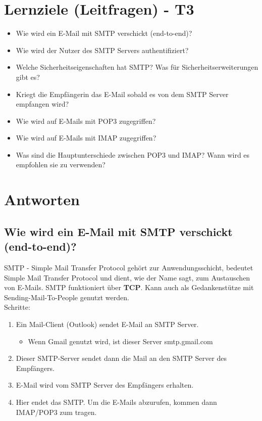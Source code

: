 \section{Lernziele (Leitfragen) - T3}
\begin{itemize}
    \item Wie wird ein E-Mail mit SMTP verschickt (end-to-end)?
    \item Wie wird der Nutzer des SMTP Servers authentifiziert?
    \item Welche Sicherheitseigenschaften hat SMTP? Was für Sicherheitserweiterungen gibt es?
    \item Kriegt die Empfängerin das E-Mail sobald es von dem SMTP Server empfangen wird?
    \item Wie wird auf E-Mails mit POP3 zugegriffen?
    \item Wie wird auf E-Mails mit IMAP zugegriffen?
    \item Was sind die Hauptunterschiede zwischen POP3 und IMAP? Wann wird es empfohlen sie zu verwenden?
\end{itemize}

\section{Antworten}
\subsection*{Wie wird ein E-Mail mit SMTP verschickt (end-to-end)?}
SMTP - Simple Mail Transfer Protocol gehört zur Anwendungsschicht, bedeutet Simple Mail Transfer Protocol und dient, wie der Name sagt, zum Austauschen von E-Mails. SMTP funktioniert über \textbf{TCP}. Kann auch als Gedankenstütze mit Sending-Mail-To-People genutzt werden.\\[1em]
Schritte:
\begin{enumerate}
    \item Ein Mail-Client (Outlook) sendet E-Mail an SMTP Server.
    \begin{itemize}
        \item Wenn Gmail genutzt wird, ist dieser Server smtp.gmail.com
    \end{itemize}
    \item Dieser SMTP-Server sendet dann die Mail an den SMTP Server des Empfängers.
    \item E-Mail wird vom SMTP Server des Empfängers erhalten.
    \item Hier endet das SMTP. Um die E-Mails abzurufen, kommen dann IMAP/POP3 zum tragen.
\end{enumerate}

